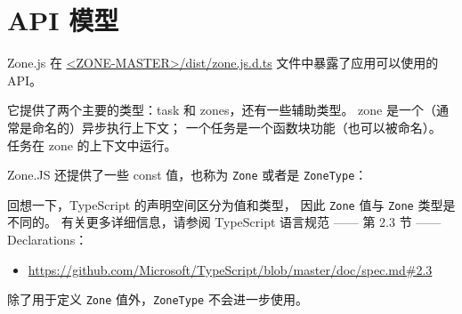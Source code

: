 \section{API 模型}


Zone.js 在
\href{https://github.com/angular/zone.js/blob/master/dist/zone.js.d.ts}
{<ZONE-MASTER>/dist/zone.js.d.ts}
文件中暴露了应用可以使用的 API。


它提供了两个主要的类型：task 和 zones，还有一些辅助类型。
zone 是一个（通常是命名的）异步执行上下文；
一个任务是一个函数块功能（也可以被命名）。
任务在 zone 的上下文中运行。


Zone.JS 还提供了一些 const 值，也称为 \texttt{Zone} 或者是 \texttt{ZoneType}：




回想一下，TypeScript 的声明空间区分为值和类型，
因此 \texttt{Zone} 值与 \texttt{Zone} 类型是不同的。
有关更多详细信息，请参阅 TypeScript 语言规范 —— 第 2.3 节 —— Declarations：

\begin{itemize}
  \item \url{https://github.com/Microsoft/TypeScript/blob/master/doc/spec.md#2.3}
\end{itemize}



除了用于定义 \texttt{Zone} 值外，\texttt{ZoneType} 不会进一步使用。

